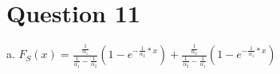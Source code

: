 \section{Question 11}

a. $F_S(x) = \frac{\frac{1}{\alpha_1}}{\frac{1}{\alpha_1}-\frac{1}{\alpha_2}}(1-e^{-\frac{1}{\alpha_2}*x}) +  \frac{\frac{1}{\alpha_2}}{\frac{1}{\alpha_2}-\frac{1}{\alpha_1}}(1-e^{-\frac{1}{\alpha_1}*x})$\\